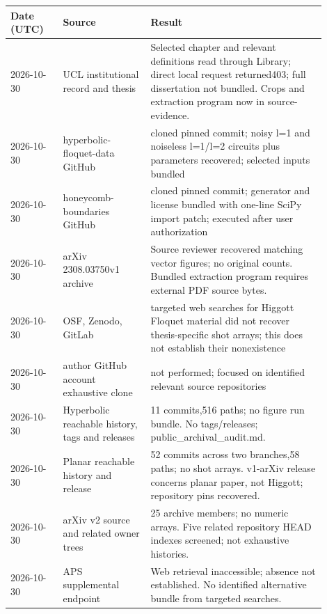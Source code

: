 \small\begin{longtable}{p{0.15\linewidth}p{0.25\linewidth}p{0.5\linewidth}}
\toprule Date (UTC) & Source & Result\\\midrule\endhead
2026-10-30 & UCL institutional record and thesis & Selected chapter and relevant definitions read through Library; direct local request returned403; full dissertation not bundled. Crops and extraction program now in source-evidence.\\
2026-10-30 & hyperbolic-floquet-data GitHub & cloned pinned commit; noisy l=1 and noiseless l=1/l=2 circuits plus parameters recovered; selected inputs bundled\\
2026-10-30 & honeycomb-boundaries GitHub & cloned pinned commit; generator and license bundled with one-line SciPy import patch; executed after user authorization\\
2026-10-30 & arXiv 2308.03750v1 archive & Source reviewer recovered matching vector figures; no original counts. Bundled extraction program requires external PDF source bytes.\\
2026-10-30 & OSF, Zenodo, GitLab & targeted web searches for Higgott Floquet material did not recover thesis-specific shot arrays; this does not establish their nonexistence\\
2026-10-30 & author GitHub account exhaustive clone & not performed; focused on identified relevant source repositories\\
2026-10-30 & Hyperbolic reachable history, tags and releases & 11 commits,516 paths; no figure run bundle. No tags/releases; public\_archival\_audit.md.\\
2026-10-30 & Planar reachable history and release & 52 commits across two branches,58 paths; no shot arrays. v1-arXiv release concerns planar paper, not Higgott; repository pins recovered.\\
2026-10-30 & arXiv v2 source and related owner trees & 25 archive members; no numeric arrays. Five related repository HEAD indexes screened; not exhaustive histories.\\
2026-10-30 & APS supplemental endpoint & Web retrieval inaccessible; absence not established. No identified alternative bundle from targeted searches.\\
\bottomrule\end{longtable}\normalsize
